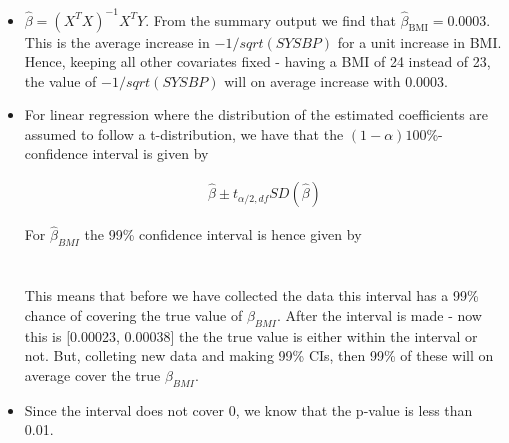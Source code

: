 \documentclass[]{article}
\newenvironment{Shaded}{\begin{snugshade}}{\end{snugshade}}
\newcommand{\KeywordTok}[1]{\textcolor[rgb]{0.13,0.29,0.53}{\textbf{#1}}}
\newcommand{\DataTypeTok}[1]{\textcolor[rgb]{0.13,0.29,0.53}{#1}}
\newcommand{\DecValTok}[1]{\textcolor[rgb]{0.00,0.00,0.81}{#1}}
\newcommand{\FloatTok}[1]{\textcolor[rgb]{0.00,0.00,0.81}{#1}}
\newcommand{\StringTok}[1]{\textcolor[rgb]{0.31,0.60,0.02}{#1}}
\newcommand{\OperatorTok}[1]{\textcolor[rgb]{0.81,0.36,0.00}{\textbf{#1}}}
\newcommand{\NormalTok}[1]{#1}
\providecommand{\tightlist}{%
  \setlength{\itemsep}{0pt}\setlength{\parskip}{0pt}}
\begin{document}
\begin{itemize}
\tightlist
\item
   \(\hat\beta = (X^TX)^{-1}X^TY\). From the summary output we find that
  \(\hat{\beta}_{\text{BMI}} = 0.0003\). This is the average increase in
  \(-1/sqrt(SYSBP)\) for a unit increase in BMI. Hence, keeping all
  other covariates fixed - having a BMI of 24 instead of 23, the value
  of \(-1/sqrt(SYSBP)\) will on average increase with 0.0003.
\item
  For linear regression where the distribution of the estimated
  coefficients are assumed to follow a t-distribution, we have that the
  \((1-\alpha)100\)\%-confidence interval is given by

  \begin{align*}
    \hat \beta \pm t_{\alpha/2, df} SD(\hat\beta)
  \end{align*}

  For \(\hat\beta_{BMI}\) the 99\% confidence interval is hence given by

  \begin{align*}
    [\hat \beta_{BMI} - t_{0.005, n-p-1} SD(\hat\beta_{BMI}), \hat \beta_{BMI} + t_{0.005, n-p-1} SD(\hat\beta_{BMI})] \\
  \end{align*}

  This means that before we have collected the data this interval has a
  99\% chance of covering the true value of \(\beta_{BMI}\). After the
  interval is made - now this is {[}0.00023, 0.00038{]} the the true
  value is either within the interval or not. But, colleting new data
  and making 99\% CIs, then 99\% of these will on average cover the true
  \(\beta_{BMI}\).
\item
  Since the interval does not cover 0, we know that the p-value is less
  than 0.01.
\end{itemize}

\begin{Shaded}
\end{Shaded}
\end{document}
